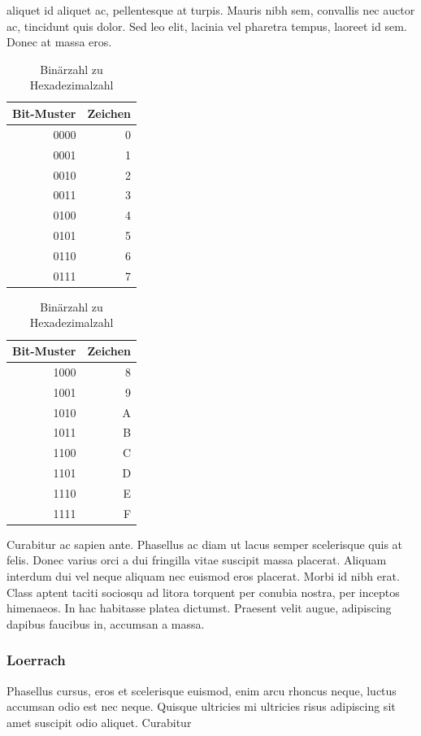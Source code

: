 aliquet id aliquet ac, pellentesque at turpis. Mauris nibh sem, convallis nec auctor ac, tincidunt quis dolor. Sed leo elit, lacinia vel pharetra tempus, laoreet id sem. Donec at massa eros.
\begin{table} \centering
\begin{tabular}{|r|r|}
\hline
Bit-Muster & Zeichen \\
\hline
0000  &  0  \\
\hline
0001  &  1  \\
\hline
0010  &  2  \\
\hline
0011  &  3  \\
\hline
0100  &  4  \\
\hline
0101  &  5  \\
\hline
0110  &  6  \\
\hline
0111  &  7  \\
\hline
\end{tabular}
\begin{tabular}{|r|r|}
\hline
Bit-Muster & Zeichen \\
\hline
1000  &  8  \\
\hline
1001  &  9  \\
\hline
1010  &  A  \\
\hline
1011  &  B  \\
\hline
1100  &  C  \\
\hline
1101  &  D  \\
\hline
1110  &  E  \\
\hline
1111  &  F  \\
\hline
\end{tabular}
\caption{Binärzahl zu Hexadezimalzahl}
\label{hex}
\end{table}

Curabitur ac sapien ante. Phasellus ac diam ut lacus semper scelerisque quis at felis. Donec varius orci a dui fringilla vitae suscipit massa placerat. Aliquam interdum dui vel neque aliquam nec euismod eros placerat. Morbi id nibh erat. Class aptent taciti sociosqu ad litora torquent per conubia nostra, per inceptos himenaeos. In hac habitasse platea dictumst. Praesent velit augue, adipiscing dapibus faucibus in, accumsan a massa.
\subsubsection{Loerrach}
Phasellus cursus, eros et scelerisque euismod, enim arcu rhoncus neque, luctus accumsan odio est nec neque. Quisque ultricies mi ultricies risus adipiscing sit amet suscipit odio aliquet. Curabitur 

